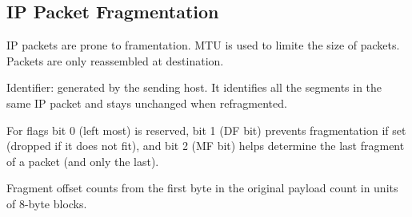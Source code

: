 \subsection{IP Packet Fragmentation}
IP packets are prone to framentation. MTU is used to limite the size of
packets. Packets are only reassembled at destination.
\begin{center}
\end{center}
Identifier: generated by the sending host. It identifies all the
segments in the same IP packet and stays unchanged when refragmented.

For flags bit 0 (left most) is reserved, bit 1 (DF bit) prevents
fragmentation if set (dropped if it does not fit), and bit 2 (MF bit)
helps determine the last fragment of a packet (and only the last).

Fragment offset counts from the first byte in the original payload count
in units of 8-byte blocks.